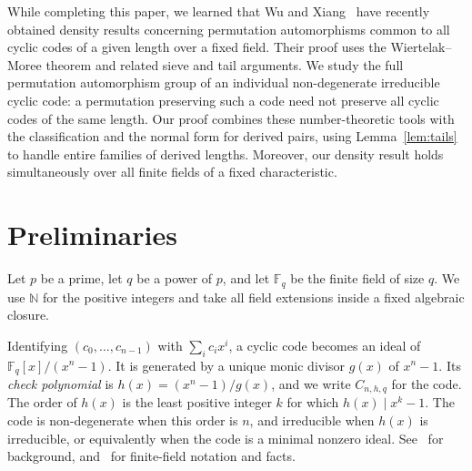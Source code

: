 \documentclass[11pt]{article}
\newcommand{\Tm}[1]{Theorem~\protect\ref{#1}}
\newcommand{\Le}[1]{Lemma~\protect\ref{#1}}
\newcommand{\gs}{\sigma}
\newcommand{\F}{{\mathbb{F}}}
\newcommand{\bbN}{{\mathbb{N}}}
\newcommand{\la}{\langle}
\newcommand{\ra}{\rangle}
\begin{document}

While completing this paper, we learned that Wu and
Xiang~\cite{WuXiang} have recently obtained density results
concerning permutation automorphisms common to all cyclic
codes of a given length over a fixed field. Their proof uses
the Wiertelak--Moree theorem and related sieve and tail
arguments. We study the full permutation automorphism group
of an individual non-degenerate irreducible cyclic code:
a permutation preserving such a code need not preserve all
cyclic codes of the same length. Our proof combines these
number-theoretic tools with the classification and the normal
form for derived pairs, using Lemma~\ref{lem:tails} to handle
entire families of derived lengths. Moreover, our density
result holds simultaneously over all finite fields of a fixed
characteristic.

\section{Preliminaries}\label{sec:pairs}

Let $p$ be a prime, let $q$ be a power of $p$, and let $\F_q$ be the
finite field of size $q$. We use $\bbN$ for the positive integers
and take all field extensions inside a fixed algebraic closure.

Identifying $(c_0,\ldots,c_{n-1})$ with $\sum_i c_i x^i$, a cyclic
code becomes an ideal of $\F_q[x]/(x^n-1)$. It is generated by a
unique monic divisor $g(x)$ of $x^n-1$. Its \emph{check polynomial}
is $h(x)=(x^n-1)/g(x)$, and we write $C_{n,h,q}$ for the code.
The order of $h(x)$ is the least positive integer $k$ for which
$h(x)\mid x^k-1$. The code is non-degenerate when this order is $n$,
and irreducible when $h(x)$ is irreducible, or equivalently when the
code is a minimal nonzero ideal. See~\cite{vanLint,MacWilliamsSloane}
for background, and~\cite{FiniteFields} for finite-field notation
and facts.
\end{document}
